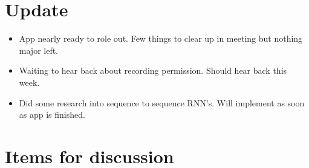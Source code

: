 \documentclass[]{weekly-report}
\begin{document}

\def\studentname{Philip Corr}
\def\projecttitle{ConvNets for iOS Gesture Recognition Applications}
\def\ucdstudentnumber{12318581}
\def\weeklyreportnumber{7}
\maketitle


\section{Update}

\begin{itemize}

\item App nearly ready to role out. Few things to clear up in meeting but nothing major left.

\item Waiting to hear back about recording permission. Should hear back this week.

\item Did some research into sequence to sequence RNN's. Will implement as soon as app is finished.
	
\end{itemize}

\section{Items for discussion}
\end{document}
